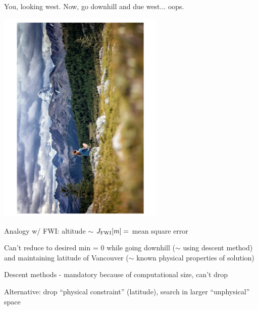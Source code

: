 \documentclass[xcolor=dvipsnames,12pt,aspectratio=169]{beamer}
\begin{document}
\begin{frame}
You, looking west. Now, {\color{blue} go downhill and due west}... oops.
\vspace{-1.5cm}
\begin{center}
\includegraphics[width=0.6\textwidth,angle=270]{Fig/mtns.pdf}
\end{center}
\vspace{-1cm}
\end{frame}

\begin{frame}
Analogy w/ FWI: altitude $\sim$ $J_{\rm FWI}[m] =$ mean square error

Can't reduce to desired min = 0 while going downhill ($\sim$ using descent method) {\color{blue} and} maintaining latitude of Vancouver ($\sim$ known physical properties of solution) 

Descent methods - mandatory because of computational size, can't drop

Alternative: drop ``physical constraint'' (latitude), search in larger ``unphysical'' space 
\end{frame}
\end{document}
